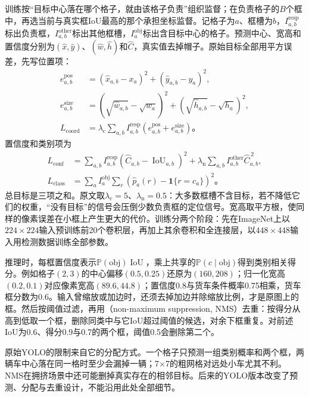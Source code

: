 训练按“目标中心落在哪个格子，就由该格子负责”组织监督；在负责格子的$B$个框中，再选当前与真实框IoU最高的那个承担坐标监督。记格子为$a$、框槽为$b$，$I^{\mathrm{resp}}_{a,b}$标出负责框，$I^{\mathrm{other}}_{a,b}$标出其他框槽，$I^{\mathrm{obj}}_a$标出含目标中心的格子。预测中心、宽高和置信度分别为$(\hat x,\hat y)$、$(\hat w,\hat h)$和$\hat C$，真实值去掉帽子。原始目标全部用平方误差，先写位置项：
\begin{equation}
 \begin{aligned}
 e_{a,b}^{\mathrm{pos}}&=(\hat x_{a,b}-x_a)^2
                       +(\hat y_{a,b}-y_a)^2,\\
 e_{a,b}^{\mathrm{size}}&=(\sqrt{\hat w_{a,b}}-\sqrt{w_a})^2
                        +(\sqrt{\hat h_{a,b}}-\sqrt{h_a})^2,\\
 L_{\mathrm{coord}}&=\lambda_{\mathrm c}\sum_{a,b}
 I^{\mathrm{resp}}_{a,b}(e_{a,b}^{\mathrm{pos}}+e_{a,b}^{\mathrm{size}})\text{。}
 \end{aligned}
 \label{eq:vision-yolo-training-process}
\end{equation}
置信度和类别项为
\[
 \begin{aligned}
 L_{\mathrm{conf}}&=\sum_{a,b}I^{\mathrm{resp}}_{a,b}
 (\hat C_{a,b}-\operatorname{IoU}_{a,b})^2
 +\lambda_{\mathrm n}\sum_{a,b}
 I^{\mathrm{other}}_{a,b}\hat C_{a,b}^{\,2},\\
 L_{\mathrm{class}}&=\sum_a I^{\mathrm{obj}}_a\sum_r
 (\hat p_a(r)-\mathbf{1}\{r=c_a\})^2\text{。}
 \end{aligned}
\]
总目标是三项之和。原文取$\lambda_{\mathrm c}=5$、$\lambda_{\mathrm n}=0.5$：大多数框槽不含目标，若不降低它们的权重，“没有目标”的信号会压倒少数负责框的定位信号。宽高取平方根，使同样的像素误差在小框上产生更大的代价。训练分两个阶段：先在ImageNet上以$224\times224$输入预训练前20个卷积层，再加上其余卷积和全连接层，以$448\times448$输入用检测数据训练全部参数。

推理时，每框置信度表示$\mathbb{P}(\mathrm{obj})\operatorname{IoU}$，乘上共享的$\mathbb{P}(c\mid\mathrm{obj})$得到类别相关得分。例如格子$(2,3)$的中心偏移$(0.5,0.25)$还原为$(160,208)$；归一化宽高$(0.2,0.1)$对应像素宽高$(89.6,44.8)$；置信度0.8与货车条件概率0.75相乘，货车框分数为0.6。输入曾缩放或加边时，还须去掉加边并除缩放比例，才是原图上的框。然后按阈值过滤，再用（non-maximum suppression, NMS）去重：按得分从高到低取一个框，删除同类中与它IoU超过阈值的候选，对余下框重复。对前述IoU为0.6、得分0.9与0.7的两个框，阈值0.5会删除第二个。

原始YOLO的限制来自它的分配方式。一个格子只预测一组类别概率和两个框，两辆车中心落在同一格时至少会漏掉一辆；7\ensuremath{\times}7的粗网格对远处小车尤其不利。NMS在拥挤场景中还可能删掉真实存在的相邻目标。后来的YOLO版本改变了预测、分配与去重设计，不能沿用此处全部细节。

